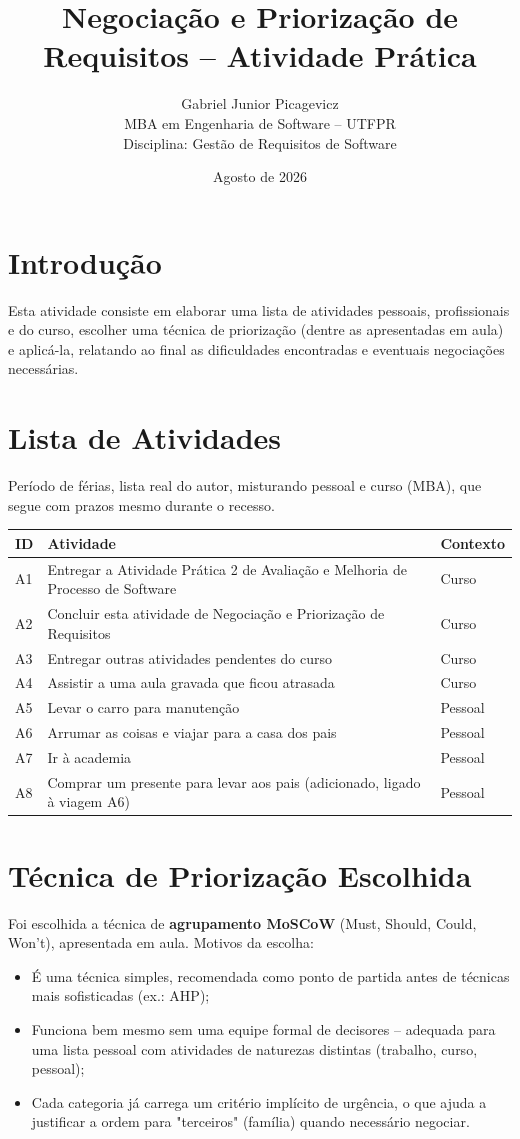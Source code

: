 \documentclass[12pt,a4paper]{article}
\title{\color{utfprAzul}Negociação e Priorização de Requisitos -- Atividade Prática}
\author{Gabriel Junior Picagevicz \\ MBA em Engenharia de Software -- UTFPR \\ Disciplina: Gestão de Requisitos de Software}
\date{Agosto de 2026}
\begin{document}
\maketitle

\section{Introdução}
Esta atividade consiste em elaborar uma lista de atividades pessoais, profissionais e do curso, escolher uma técnica de priorização (dentre as apresentadas em aula) e aplicá-la, relatando ao final as dificuldades encontradas e eventuais negociações necessárias.

\section{Lista de Atividades}
Período de férias, lista real do autor, misturando pessoal e curso (MBA), que segue com prazos mesmo durante o recesso.

\begin{longtable}{C{1.2cm} L{7.3cm} C{2.5cm}}
\toprule
{}
\textbf{ID} & \textbf{Atividade} & \textbf{Contexto} \\
\midrule
A1 & Entregar a Atividade Prática 2 de Avaliação e Melhoria de Processo de Software & Curso \\
A2 & Concluir esta atividade de Negociação e Priorização de Requisitos & Curso \\
A3 & Entregar outras atividades pendentes do curso & Curso \\
A4 & Assistir a uma aula gravada que ficou atrasada & Curso \\
A5 & Levar o carro para manutenção & Pessoal \\
A6 & Arrumar as coisas e viajar para a casa dos pais & Pessoal \\
A7 & Ir à academia & Pessoal \\
A8 & Comprar um presente para levar aos pais (adicionado, ligado à viagem A6) & Pessoal \\
\bottomrule
\end{longtable}

\section{Técnica de Priorização Escolhida}
Foi escolhida a técnica de \textbf{agrupamento MoSCoW} (Must, Should, Could, Won't), apresentada em aula. Motivos da escolha:
\begin{itemize}[nosep]
    \item É uma técnica simples, recomendada como ponto de partida antes de técnicas mais sofisticadas (ex.: AHP);
    \item Funciona bem mesmo sem uma equipe formal de decisores -- adequada para uma lista pessoal com atividades de naturezas distintas (trabalho, curso, pessoal);
    \item Cada categoria já carrega um critério implícito de urgência, o que ajuda a justificar a ordem para "terceiros" (família) quando necessário negociar.
\end{itemize}
\end{document}
